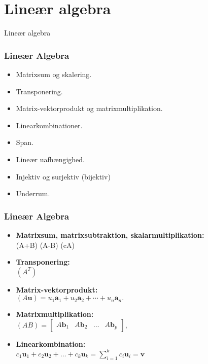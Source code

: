 \section{Lineær algebra}
\begin{frame}
\centering
\Huge
Lineær algebra
\end{frame}
%
\begin{frame}
\frametitle{Lineær Algebra}
\begin{itemize}
\item Matrixsum og skalering.
\item Transponering.
\item Matrix-vektorprodukt og matrixmultiplikation.
\item Linearkombinationer.
\item Span.
\item Lineær uafhængighed.
\item Injektiv og surjektiv (bijektiv)
\item Underrum.
\end{itemize}
\end{frame}
\begin{frame}
\frametitle{Lineær Algebra}
\begin{itemize}
\item \textbf{Matrixsum, matrixsubtraktion, skalarmultiplikation: } \\ 
\phantom{11}(A+B)\phantom{11111111}  (A-B)\phantom{1111111111111}  (cA)
\item \textbf{Transponering: } \\ 
\phantom{111}$(A^T)$ 
\item \textbf{Matrix-vektorprodukt: } \\
$(A\textbf{u}) =u_1\textbf{a}_1 + u_2\textbf{a}_2 + \cdots + u_n\textbf{a}_n.$ \\
\item \textbf{Matrixmultiplikation: } \\
$(AB) =
\begin{bmatrix}
A\textbf{b}_1 & A\textbf{b}_2 & \ldots & A\textbf{b}_p
\end{bmatrix}\text{,}$
%
\item \textbf{Linearkombination: } \\
$c_1\mathbf{u}_1+c_2\mathbf{u}_2+\ldots+c_k\mathbf{u}_k=\sum\limits_{i=1}^k c_i\mathbf{u}_i=\mathbf{v}$
\end{itemize}
\end{frame}
